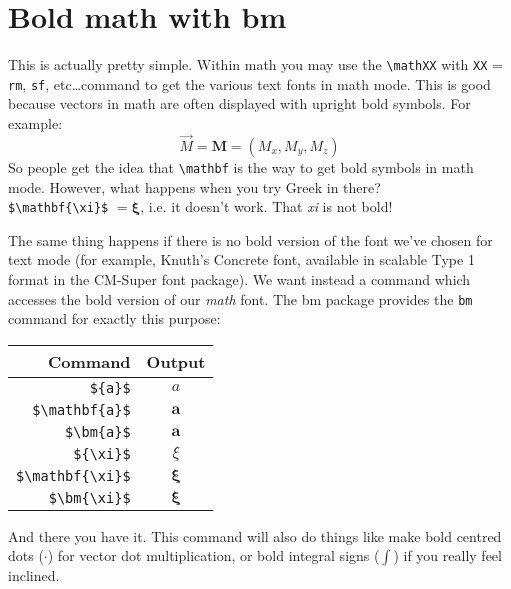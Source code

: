 \documentclass[12pt,article]{memoir}
\begin{document}
\chapter*{Bold math with \textsf{bm}}

This is actually pretty simple. Within math you may use the \verb|\mathXX| with \texttt{XX} = \texttt{rm}, \texttt{sf}, etc\dots command to get the various text fonts in math mode. This is good because vectors in math are often displayed with upright bold symbols. For example:
\[
\vec{M} = \mathbf{M} = (M_x,M_y,M_z)
\]
So people get the idea that \verb|\mathbf| is the way to get bold symbols in math mode. However, what happens when you try Greek in there?\\
\verb|$\mathbf{\xi}$| $=\mathbf{\xi}$, i.e. it doesn't work. That \textit{xi} is not bold!

The same thing happens if there is no bold version of the font we've chosen for text mode (for example, Knuth's Concrete font, available in scalable Type 1 format in the CM-Super font package). We want instead a command which accesses the bold version of our \emph{math} font. The \textsf{bm} package provides the \texttt{bm} command for exactly this purpose:

\begin{center}
   \begin{tabular}{@{} rc @{}} %
      \toprule
      Command    & Output \\
      \midrule
	\verb|${a}$| & $a$\\
	\verb|$\mathbf{a}$| & $\mathbf{a}$\\
	\verb|$\bm{a}$| & $\bm{a}$\\
	\midrule
	\verb|${\xi}$| & $\xi$\\
	\verb|$\mathbf{\xi}$| & $\mathbf{\xi}$\\
	\verb|$\bm{\xi}$| & $\bm{\xi}$\\	
      \bottomrule
   \end{tabular}
\end{center}

And there you have it. This command will also do things like make bold centred dots ($\bm{\cdot}$) for vector dot multiplication, or bold integral signs ($\bm{\int}$) if you really feel inclined.
\end{document}
